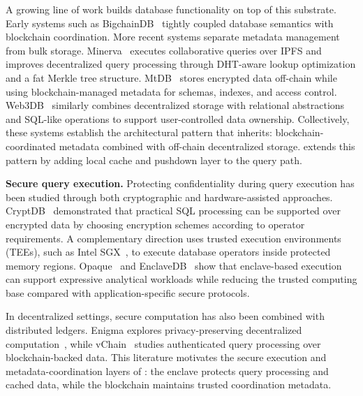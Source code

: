A growing line of work builds database functionality on top of this substrate. Early systems such as BigchainDB~\cite{mcconaghy2016bigchaindb} tightly coupled database semantics with blockchain coordination. More recent systems separate metadata management from bulk storage. Minerva~\cite{yao2024minerva} executes collaborative queries over IPFS and improves decentralized query processing through DHT-aware lookup optimization and a fat Merkle tree structure. MtDB~\cite{hossain2025mtdb} stores encrypted data off-chain while using blockchain-managed metadata for schemas, indexes, and access control. Web3DB~\cite{mukherjee2025web3db} similarly combines decentralized storage with relational abstractions and SQL-like operations to support user-controlled data ownership. Collectively, these systems establish the architectural pattern that \ours{} inherits: blockchain-coordinated metadata combined with off-chain decentralized storage. \ours{} extends this pattern by adding local cache and pushdown layer to the query path.
 
\textbf{Secure query execution.}
Protecting confidentiality during query execution has been studied through both cryptographic and hardware-assisted approaches. CryptDB~\cite{popa2011cryptdb} demonstrated that practical SQL processing can be supported over encrypted data by choosing encryption schemes according to operator requirements. A complementary direction uses trusted execution environments (TEEs), such as Intel SGX~\cite{costan2016intel}, to execute database operators inside protected memory regions. Opaque~\cite{zheng2017opaque} and EnclaveDB~\cite{priebe2018enclavedb} show that enclave-based execution can support expressive analytical workloads while reducing the trusted computing base compared with application-specific secure protocols.
 
In decentralized settings, secure computation has also been combined with distributed ledgers. Enigma explores privacy-preserving decentralized computation~\cite{zyskind2018enigma}, while vChain~\cite{xu2019vchain} studies authenticated query processing over blockchain-backed data. This literature motivates the secure execution and metadata-coordination layers of \ours{}: the enclave protects query processing and cached data, while the blockchain maintains trusted coordination metadata.
 
